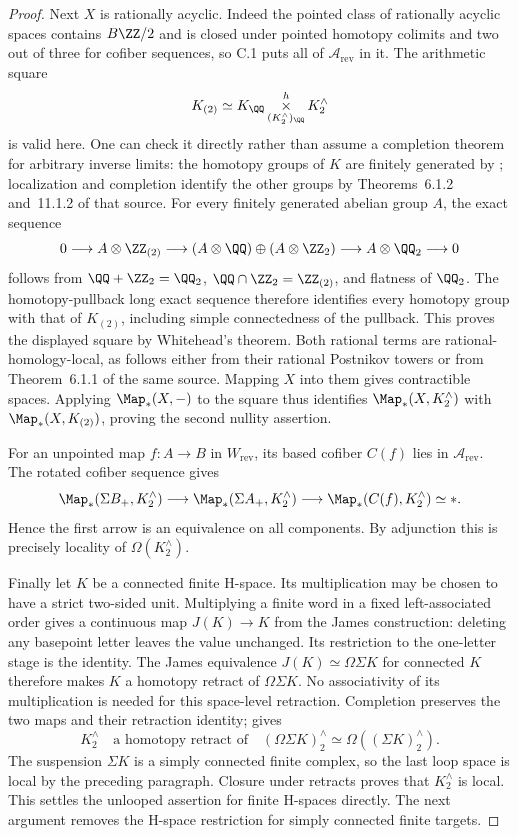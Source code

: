 \begin{proof}
Next $X$ is rationally acyclic. Indeed the pointed class of rationally acyclic spaces contains $B\ZZ/2$ and is closed under pointed homotopy colimits and two out of three for cofiber sequences, so C.1 puts all of $\mathcal A_{\mathrm{rev}}$ in it. The arithmetic square
\[
 K_{(2)}\simeq K_{\QQ}\mathop{\times}\limits^h_{(K^{\wedge}_2)_{\QQ}}K^{\wedge}_2
\]
is valid here. One can check it directly rather than assume a completion theorem for arbitrary inverse limits: the homotopy groups of $K$ are finitely generated by \cite[Theorem 4.5.2]{FGHMayPonto2012}; localization and completion identify the other groups by Theorems~6.1.2 and~11.1.2 of that source. For every finitely generated abelian group $A$, the exact sequence
\[
 0\longrightarrow A\otimes\ZZ_{(2)}\longrightarrow
 (A\otimes\QQ)\oplus(A\otimes\ZZ_2)\longrightarrow
 A\otimes\QQ_2\longrightarrow0
\]
follows from $\QQ+\ZZ_2=\QQ_2$, $\QQ\cap\ZZ_2=\ZZ_{(2)}$, and flatness of $\QQ_2$. The homotopy-pullback long exact sequence therefore identifies every homotopy group with that of $K_{(2)}$, including simple connectedness of the pullback. This proves the displayed square by Whitehead's theorem. Both rational terms are rational-homology-local, as follows either from their rational Postnikov towers or from Theorem~6.1.1 of the same source. Mapping $X$ into them gives contractible spaces. Applying $\Map_*(X,-)$ to the square thus identifies $\Map_*(X,K^{\wedge}_2)$ with $\Map_*(X,K_{(2)})$, proving the second nullity assertion.

For an unpointed map $f:A\to B$ in $W_{\mathrm{rev}}$, its based cofiber $C(f)$ lies in $\mathcal A_{\mathrm{rev}}$. The rotated cofiber sequence gives
\[
 \Map_*(\Sigma B_+,K^{\wedge}_2)\longrightarrow
 \Map_*(\Sigma A_+,K^{\wedge}_2)\longrightarrow
 \Map_*(C(f),K^{\wedge}_2)\simeq *.
\]
Hence the first arrow is an equivalence on all components. By adjunction this is precisely locality of $\Omega(K^{\wedge}_2)$.

Finally let $K$ be a connected finite H-space. Its multiplication may be chosen to have a strict two-sided unit. Multiplying a finite word in a fixed left-associated order gives a continuous map $J(K)\to K$ from the James construction: deleting any basepoint letter leaves the value unchanged. Its restriction to the one-letter stage is the identity. The James equivalence $J(K)\simeq\Omega\Sigma K$ for connected $K$ therefore makes $K$ a homotopy retract of $\Omega\Sigma K$. No associativity of its multiplication is needed for this space-level retraction. Completion preserves the two maps and their retraction identity; \cite[Proposition 11.2.4]{FGHMayPonto2012} gives
\[
 K^{\wedge}_2\quad\text{a homotopy retract of}\quad
 (\Omega\Sigma K)^{\wedge}_2\simeq\Omega((\Sigma K)^{\wedge}_2).
\]
The suspension $\Sigma K$ is a simply connected finite complex, so the last loop space is local by the preceding paragraph. Closure under retracts proves that $K^{\wedge}_2$ is local. This settles the unlooped assertion for finite H-spaces directly. The next argument removes the H-space restriction for simply connected finite targets.
\end{proof}

